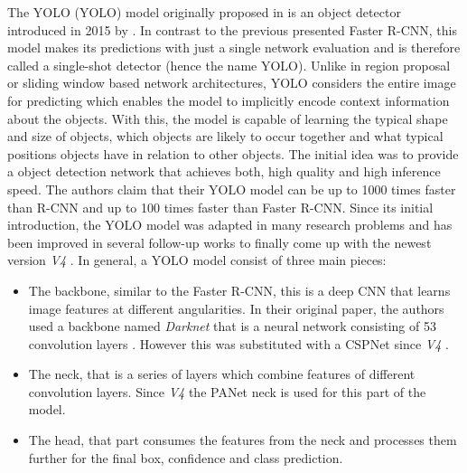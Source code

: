 The \acl{YOLO} (\ac{YOLO}) model originally proposed in \autocite{yoloOriginal} is an object detector introduced in 2015 by \citeauthor{yoloOriginal}. In contrast to the previous presented Faster \ac{R-CNN}, this model makes its predictions with just a single network evaluation and is therefore called a single-shot detector (hence the name \ac{YOLO}). Unlike in region proposal or sliding window based network architectures, \ac{YOLO} considers the entire image
for predicting which enables the model to implicitly encode context information about the objects. With this, the model is capable of learning the typical shape and size of objects, which objects are likely to occur together and what typical positions objects have in relation to other objects. The initial idea was to provide a object detection network that achieves both, high quality and high inference speed. The authors claim that their \ac{YOLO} model can be up to 1000 times faster than \ac{R-CNN} and up to 100 times faster than Faster \ac{R-CNN}.
Since its initial introduction, the \ac{YOLO} model was adapted in many research problems and has been improved in several follow-up works \autocite{yolov2} \autocite{yolov3} to finally come up with the newest version \textit{V4} \autocite{yolov4}.
In general, a \ac{YOLO} model consist of three main pieces:
\begin{itemize}
	\item The backbone, similar to the Faster \ac{R-CNN}, this is a deep \ac{CNN} that learns image features at different angularities. In their original paper, the authors used a backbone named \textit{Darknet} that is a neural network consisting of 53 convolution
	layers \autocite{yolov3}. However this was substituted with a CSPNet \autocite{wang2020cspnet} since \textit{V4} \autocite{yolov4}.
	\item The neck, that is a series of layers which combine features of different convolution layers. Since \textit{V4} the PANet \autocite{tan2020efficientdet} neck is used for this part of the model. 
	\item The head, that part consumes the features from the neck and processes them further for the final box, confidence and class prediction.
\end{itemize}
